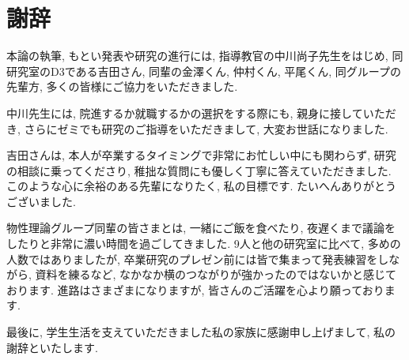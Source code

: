 \chapter*{謝辞}

本論の執筆, もとい発表や研究の進行には, 指導教官の中川尚子先生をはじめ, 同研究室のD3である吉田さん, 同輩の金澤くん, 仲村くん, 平尾くん, 同グループの先輩方, 多くの皆様にご協力をいただきました. 

中川先生には, 院進するか就職するかの選択をする際にも, 親身に接していただき, さらにゼミでも研究のご指導をいただきまして, 大変お世話になりました. 

吉田さんは, 本人が卒業するタイミングで非常にお忙しい中にも関わらず, 研究の相談に乗ってくださり, 稚拙な質問にも優しく丁寧に答えていただきました. このような心に余裕のある先輩になりたく, 私の目標です. たいへんありがとうございました. 

物性理論グループ同輩の皆さまとは, 一緒にご飯を食べたり, 夜遅くまで議論をしたりと非常に濃い時間を過ごしてきました. 9人と他の研究室に比べて, 多めの人数ではありましたが, 卒業研究のプレゼン前には皆で集まって発表練習をしながら, 資料を練るなど, なかなか横のつながりが強かったのではないかと感じております. 進路はさまざまになりますが, 皆さんのご活躍を心より願っております.

最後に, 学生生活を支えていただきました私の家族に感謝申し上げまして, 私の謝辞といたします.

